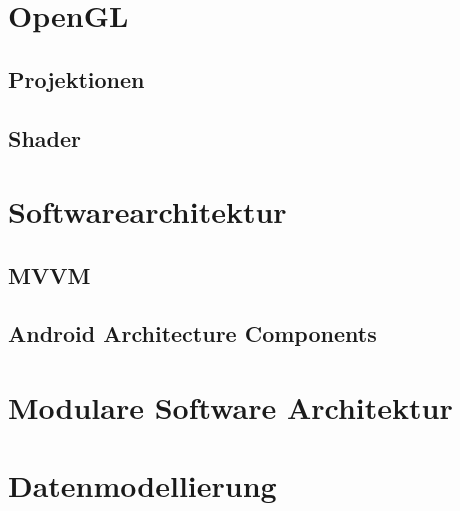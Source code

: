 
\section{OpenGL}
\label{chap:OpenGL}
\subsection{Projektionen}
\subsection{Shader}

\section{Softwarearchitektur}
\label{chap:Softwarearchitektur}
\subsection{MVVM}
\subsection{Android Architecture Components}

\section{Modulare Software Architektur}
\label{chap:Modulare Software Architektur}

\section{Datenmodellierung}
\label{chap:Datenmodellierung}